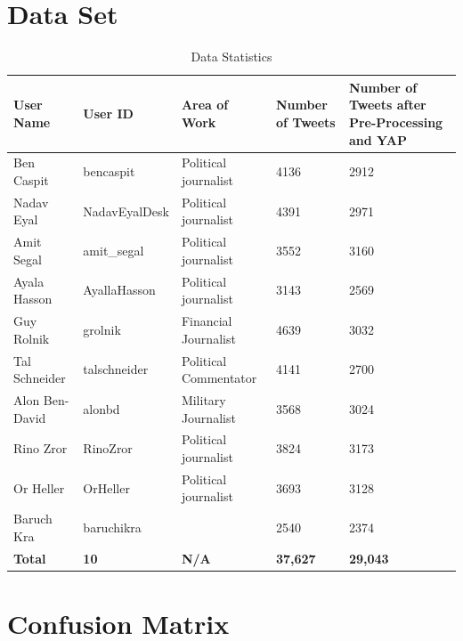 \documentclass[a4paper]{article}
\begin{document}



\clearpage
\onecolumn
\begin{appendices}
\section{Data Set}
\label{apx:data set}
\begin{table}[htbp]
	\centering
		\begin{tabular}{| l | l | l | l | p{4cm} |}
		\hline
		\textbf{User Name} & \textbf{User ID} & \textbf{Area of Work} & \textbf{Number of Tweets} & \textbf{Number of Tweets after Pre-Processing and YAP} \\ \hline
    Ben Caspit & bencaspit & Political journalist & 4136  & 2912 \\ \hline
    Nadav Eyal & NadavEyalDesk & Political journalist & 4391  & 2971 \\ \hline
    Amit Segal & amit\_segal & Political journalist & 3552  & 3160 \\ \hline
    Ayala Hasson & AyallaHasson & Political journalist & 3143  & 2569 \\ \hline
    Guy Rolnik & grolnik & Financial Journalist & 4639  & 3032 \\ \hline
    Tal Schneider & talschneider & Political Commentator & 4141  & 2700 \\ \hline
    Alon Ben-David & alonbd & Military Journalist & 3568  & 3024 \\ \hline
    Rino Zror & RinoZror & Political journalist & 3824  & 3173 \\ \hline
    Or Heller & OrHeller & Political journalist & 3693  & 3128 \\ \hline
    Baruch Kra & baruchikra &  & 2540  & 2374 \\ \hline
	\textbf{Total} & \textbf{10} & \textbf{N/A} & \textbf{37,627} & \textbf{29,043} \\ \hline
\end{tabular}
\caption{Data Statistics}
\label{tab:datastats}%
\end{table}

\section{Confusion Matrix}
\label{apx:confusion matrix}


\end{appendices}
\end{document}
